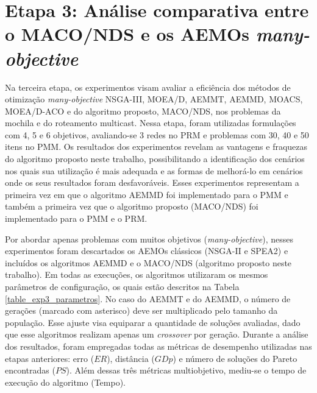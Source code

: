 \section{Etapa 3: Análise comparativa entre o MACO/NDS e os AEMOs \textit{many-objective}}
\label{section_experimentos_etapa3}

Na terceira etapa, os experimentos visam avaliar a eficiência dos métodos de otimização \textit{many-objective} NSGA-III, MOEA/D, AEMMT, AEMMD, MOACS, MOEA/D-ACO e do algoritmo proposto, MACO/NDS, nos problemas da mochila e do roteamento multicast. Nessa etapa, foram utilizadas formulações com 4, 5 e 6 objetivos, avaliando-se 3 redes no PRM e problemas com 30, 40 e 50 itens no PMM. Os resultados dos experimentos revelam as vantagens e fraquezas do algoritmo proposto neste trabalho, possibilitando a identificação dos cenários nos quais sua utilização é mais adequada e as formas de melhorá-lo em cenários onde os seus resultados foram desfavoráveis. Esses experimentos representam a primeira vez em que o algoritmo AEMMD foi implementado para o PMM e também a primeira vez que o algoritmo proposto (MACO/NDS) foi implementado para o PMM e o PRM.

Por abordar apenas problemas com muitos objetivos (\textit{many-objective}), nesses experimentos foram descartados os AEMOs clássicos (NSGA-II e SPEA2) e incluídos os algoritmos AEMMD e o MACO/NDS (algoritmo proposto neste trabalho). Em todas as execuções, os algoritmos utilizaram os mesmos parâmetros de configuração, os quais estão descritos na Tabela \ref{table_exp3_parametros}. No caso do AEMMT e do AEMMD, o número de gerações (marcado com asterisco) deve ser multiplicado pelo tamanho da população. Esse ajuste visa equiparar a quantidade de soluções avaliadas, dado que esse algoritmos realizam apenas um \textit{crossover} por geração. Durante a análise dos resultados, foram empregadas todas as métricas de desempenho utilizadas nas etapas anteriores: erro ($ER$),  distância ($GDp$) e número de soluções do Pareto encontradas ($PS$). Além dessas três métricas multiobjetivo, mediu-se o tempo de execução do algoritmo (Tempo).

